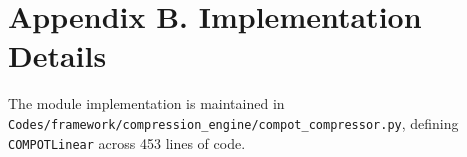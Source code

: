 \section*{Appendix B. Implementation Details}
The module implementation is maintained in \texttt{Codes/framework/compression\_engine/compot\_compressor.py}, defining \texttt{COMPOTLinear} across 453 lines of code.
